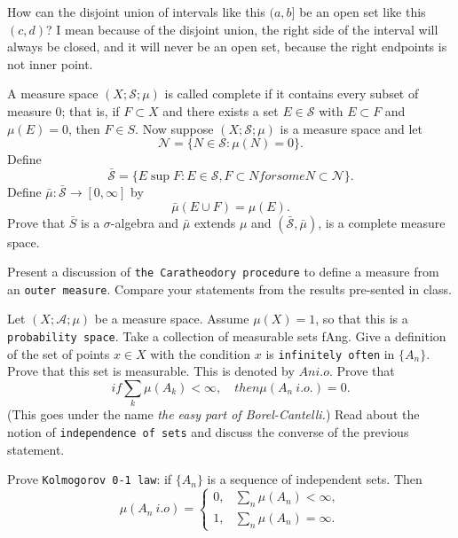 \documentclass[12pt]{article}
\newenvironment{exercise}[1]{\begin{tcolorbox}[colback=black!15, colframe=black!80, breakable, title=#1]}{\end{tcolorbox}}
\newenvironment{solution}{\begin{tcolorbox}[colback=white, colframe=black!50, breakable, title=Solution. ]\setlength{\parskip}{0.8em}}{\end{tcolorbox}}
\begin{document}
    \begin{solution}
        How can the disjoint union of intervals like this $(a,b]$ be an open set like this $(c,d)$? I mean because of the disjoint union, the right side of the interval will always be closed, and it will never be an open set, because the right endpoints is not inner point. 
    \end{solution}

    \begin{exercise}{6}
        A measure space $(X; \mathscr{S}; \mu)$ is called complete if it contains every subset of measure $0$; that is, if $F \subset X$ and there exists a set $E \in \mathscr{S}$ with $E \subset F$ and $\mu(E) = 0$, then $F \in S$. Now suppose $(X; \mathscr{S}; \mu)$ is a measure space and let
        \[\mathscr{N}=\{N\in\mathscr{S}:\mu(N)=0\}. \]
        Define
        \[\bar{\mathscr{S}}=\{E\sup F: E\in\mathscr{S}, F\subset N for some N\subset \mathscr{N}\}. \]
        Define $\bar{\mu}: \bar{\mathscr{S}}\to[0,\infty]$ by
        \[\bar{\mu}(E\cup F)=\mu(E). \]
        Prove that $\bar{S}$ is a $\sigma$-algebra and $\bar{\mu}$ extends $\mu$ and $(\bar{\mathscr{S}}, \bar{\mu})$, is a complete measure space. 
    \end{exercise}

    \begin{exercise}{7}
        Present a discussion of \texttt{the Caratheodory procedure} to define a measure from an \texttt{outer measure}. Compare your statements from the results pre-sented in class. 
    \end{exercise}

    \begin{exercise}{8}
        Let $(X; \mathscr{A}; \mu)$ be a measure space. Assume $\mu(X) = 1$, so that this is a \texttt{probability space}. Take a collection of measurable sets fAng. Give a definition of the set of points $x \in X$ with the condition $x$ is \texttt{infinitely often} in $\{A_n\}$. Prove that this set is measurable. This is denoted by $An i.o.$ Prove that
        \[if \sum_k \mu(A_k)<\infty, \quad then \mu(A_n\ i.o.)=0. \]
        (This goes under the name \emph{the easy part of Borel-Cantelli.}) Read about the
        notion of \texttt{independence of sets} and discuss the converse of the previous
        statement.
    \end{exercise}

    \begin{exercise}{9}
        Prove \texttt{Kolmogorov 0-1 law}: if $\{A_n\}$ is a sequence of independent sets. Then
        \[
            \mu(A_n\ i.o)=\begin{cases}
                0, & \sum_{n}\mu(A_n)<\infty, \\
                1, & \sum_{n}\mu(A_n)=\infty. 
            \end{cases}
        \]
    \end{exercise}
\end{document}
